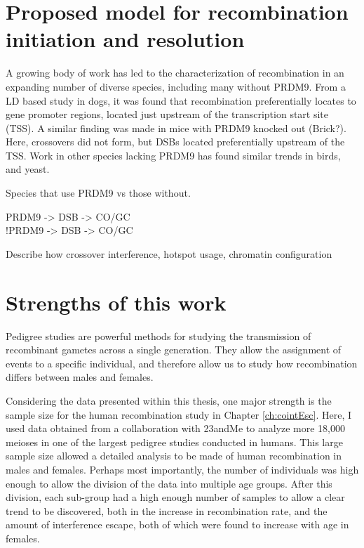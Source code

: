 \section{Proposed model for recombination initiation and resolution}

A growing body of work has led to the characterization of recombination in an expanding number of diverse species, including many without PRDM9.
From a LD based study in dogs, it was found that recombination preferentially locates to gene promoter regions, located just upstream of the transcription start site (TSS)\cite{Auton2013}.
A similar finding was made in mice with PRDM9 knocked out (Brick?).  Here, crossovers did not form, but DSBs located preferentially upstream of the TSS.
Work in other species lacking PRDM9 has found similar trends in birds\cite{Singhal2015}, and yeast\cite{Lam2015}.

Species that use PRDM9 vs those without.

PRDM9 -> DSB -> CO/GC \\
!PRDM9 -> DSB -> CO/GC

Describe how crossover interference, hotspot usage, chromatin configuration 




\section{Strengths of this work}
Pedigree studies are powerful methods for studying the transmission of recombinant gametes across a single generation.
They allow the assignment of events to a specific individual, and therefore allow us to study how recombination differs between males and females.

Considering the data presented within this thesis, one major strength is the sample size for the human recombination study in Chapter \ref{ch:cointEsc}.
Here, I used data obtained from a collaboration with 23andMe to analyze more 18,000 meioses in one of the largest pedigree studies conducted in humans\cite{Campbell2015}.
This large sample size allowed a detailed analysis to be made of human recombination in males and females.
Perhaps most importantly, the number of individuals was high enough to allow the division of the data into multiple age groups.
After this division, each sub-group had a high enough number of samples to allow a clear trend to be discovered, both in the increase in recombination rate, and the amount of interference escape, both of which were found to increase with age in females.

